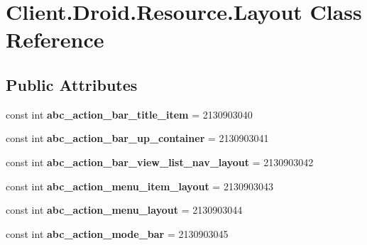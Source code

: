 \hypertarget{classClient_1_1Droid_1_1Resource_1_1Layout}{}\section{Client.\+Droid.\+Resource.\+Layout Class Reference}
\label{classClient_1_1Droid_1_1Resource_1_1Layout}
\subsection*{Public Attributes}
\begin{DoxyCompactItemize}
\item 
\hypertarget{classClient_1_1Droid_1_1Resource_1_1Layout_aa6c3ab8ff9cac806f61d05e3b4268d65}{}const int {\bfseries abc\+\_\+action\+\_\+bar\+\_\+title\+\_\+item} = 2130903040\label{classClient_1_1Droid_1_1Resource_1_1Layout_aa6c3ab8ff9cac806f61d05e3b4268d65}

\item 
\hypertarget{classClient_1_1Droid_1_1Resource_1_1Layout_afd8fb11b567933d71e3829794fbc7a4d}{}const int {\bfseries abc\+\_\+action\+\_\+bar\+\_\+up\+\_\+container} = 2130903041\label{classClient_1_1Droid_1_1Resource_1_1Layout_afd8fb11b567933d71e3829794fbc7a4d}

\item 
\hypertarget{classClient_1_1Droid_1_1Resource_1_1Layout_a794ca2226536e7ed933b7d43b33ca3d0}{}const int {\bfseries abc\+\_\+action\+\_\+bar\+\_\+view\+\_\+list\+\_\+nav\+\_\+layout} = 2130903042\label{classClient_1_1Droid_1_1Resource_1_1Layout_a794ca2226536e7ed933b7d43b33ca3d0}

\item 
\hypertarget{classClient_1_1Droid_1_1Resource_1_1Layout_a018fe6b4f31b00c957e34f5284476746}{}const int {\bfseries abc\+\_\+action\+\_\+menu\+\_\+item\+\_\+layout} = 2130903043\label{classClient_1_1Droid_1_1Resource_1_1Layout_a018fe6b4f31b00c957e34f5284476746}

\item 
\hypertarget{classClient_1_1Droid_1_1Resource_1_1Layout_aed1c955214ee13192106183c9d270fa8}{}const int {\bfseries abc\+\_\+action\+\_\+menu\+\_\+layout} = 2130903044\label{classClient_1_1Droid_1_1Resource_1_1Layout_aed1c955214ee13192106183c9d270fa8}

\item 
\hypertarget{classClient_1_1Droid_1_1Resource_1_1Layout_a7ef99406233fcac2c42b0129fb0ee2c0}{}const int {\bfseries abc\+\_\+action\+\_\+mode\+\_\+bar} = 2130903045\label{classClient_1_1Droid_1_1Resource_1_1Layout_a7ef99406233fcac2c42b0129fb0ee2c0}


\end{DoxyCompactItemize}
